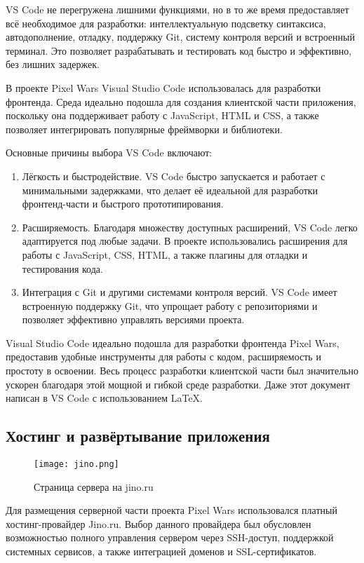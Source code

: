 VS Code не перегружена лишними функциями, но в то же время предоставляет всё необходимое для разработки: интеллектуальную подсветку синтаксиса, автодополнение, отладку, поддержку Git, систему контроля версий и встроенный терминал. Это позволяет разрабатывать и тестировать код быстро и эффективно, без лишних задержек.

В проекте Pixel Wars Visual Studio Code использовалась для разработки фронтенда. Среда идеально подошла для создания клиентской части приложения, поскольку она поддерживает работу с JavaScript, HTML и CSS, а также позволяет интегрировать популярные фреймворки и библиотеки.

Основные причины выбора VS Code включают:
\begin{enumerate}
    \item
          Лёгкость и быстродействие. VS Code быстро запускается и работает с минимальными задержками, что делает её идеальной для разработки фронтенд-части и быстрого прототипирования.
    \item
          Расширяемость. Благодаря множеству доступных расширений, VS Code легко адаптируется под любые задачи. В проекте использовались расширения для работы с JavaScript, CSS, HTML, а также плагины для отладки и тестирования кода.
    \item
          Интеграция с Git и другими системами контроля версий. VS Code имеет встроенную поддержку Git, что упрощает работу с репозиториями и позволяет эффективно управлять версиями проекта.
\end{enumerate}

Visual Studio Code идеально подошла для разработки фронтенда Pixel Wars, предоставив удобные инструменты для работы с кодом, расширяемость и простоту в освоении. Весь процесс разработки клиентской части был значительно ускорен благодаря этой мощной и гибкой среде разработки. Даже этот документ написан в VS Code с использованием \LaTeX.

\subsection{Хостинг и развёртывание приложения}

\begin{figure}[H]
    \texttt{[image: jino.png]}
    \caption{Страница сервера на jino.ru}
\end{figure}

Для размещения серверной части проекта Pixel Wars использовался платный хостинг-провайдер Jino.ru. Выбор данного провайдера был обусловлен возможностью полного управления сервером через SSH-доступ, поддержкой системных сервисов, а также интеграцией доменов и SSL-сертификатов. \cite{jino}

